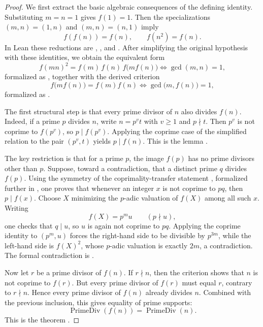 \begin{proof}
We first extract the basic algebraic consequences of the defining identity.
Substituting \(m=n=1\) gives \(f(1)=1\). Then the specializations
\((m,n)=(1,n)\) and \((m,n)=(n,1)\) imply
\[
  f(f(n))=f(n), \qquad f(n^2)=f(n).
\]
In Lean these reductions are
,
, and
. After simplifying the
original hypothesis with these identities, we obtain the equivalent form
\[
  f(mn)^2 = f(m)\,f(n)\,f\bigl(mf(n)\bigr)
  \iff \gcd(m,n)=1,
\]
formalized as , together
with the derived criterion
\[
  f\bigl(mf(n)\bigr)=f(m)f(n)
  \iff \gcd\bigl(m,f(n)\bigr)=1,
\]
formalized as .

The first structural step is that every prime divisor of \(n\) also divides
\(f(n)\). Indeed, if a prime \(p\) divides \(n\), write \(n=p^v t\) with
\(v\ge 1\) and \(p\nmid t\). Then \(p^v\) is not coprime to \(f(p^v)\), so
\(p\mid f(p^v)\). Applying the coprime case of the simplified relation to the
pair \((p^v,t)\) yields \(p\mid f(n)\). This is the lemma
.

The key restriction is that for a prime \(p\), the image \(f(p)\) has no prime
divisors other than \(p\). Suppose, toward a contradiction, that a distinct
prime \(q\) divides \(f(p)\). Using the symmetry of the coprimality-transfer
statement
,
formalized further in
,
one proves that whenever an integer \(x\) is not coprime to \(pq\), then
\(p\mid f(x)\). Choose \(X\) minimizing the \(p\)-adic valuation of \(f(X)\)
among all such \(x\). Writing
\[
  f(X)=p^m u \qquad (p\nmid u),
\]
one checks that \(q\mid u\), so \(u\) is again not coprime to \(pq\). Applying
the coprime identity to \((p^m,u)\) forces the right-hand side to be divisible
by \(p^{3m}\), while the left-hand side is \(f(X)^2\), whose \(p\)-adic
valuation is exactly \(2m\), a contradiction. The formal contradiction is
.

Now let \(r\) be a prime divisor of \(f(n)\). If \(r\nmid n\), then the
criterion
shows that \(n\) is not coprime to \(f(r)\). But every prime divisor of
\(f(r)\) must equal \(r\), contrary to \(r\nmid n\). Hence every prime divisor
of \(f(n)\) already divides \(n\). Combined with the previous inclusion, this
gives equality of prime supports:
\[
  \operatorname{PrimeDiv}(f(n))=\operatorname{PrimeDiv}(n).
\]
This is the theorem
.


\end{proof}

